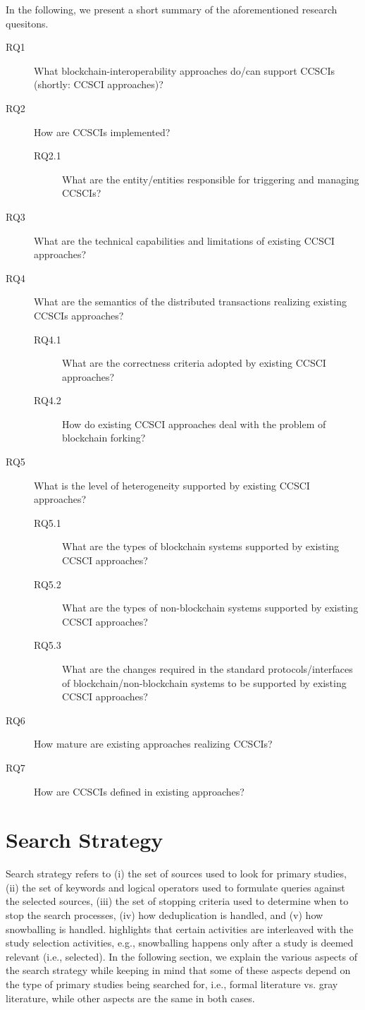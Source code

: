 \documentclass[review]{elsarticle}
\begin{document}
In the following, we present a short summary of the aforementioned research quesitons.
\begin{description}
	\item[RQ1] What blockchain-interoperability approaches do/can support CCSCIs (shortly: CCSCI approaches)?
	\item[RQ2] How are CCSCIs implemented?
	\begin{description}
		\item[RQ2.1] What are the entity/entities responsible for triggering and managing CCSCIs?
	\end{description}
	\item[RQ3] What are the technical capabilities and limitations of existing CCSCI approaches?
	\item[RQ4] What are the semantics of the distributed transactions realizing existing CCSCIs approaches?
	\begin{description}
		\item[RQ4.1] What are the correctness criteria adopted by existing CCSCI approaches?
		\item[RQ4.2] How do existing CCSCI approaches deal with the problem of blockchain forking?
	\end{description}
	\item[RQ5] What is the level of heterogeneity supported by existing CCSCI approaches?
	\begin{description}
		\item[RQ5.1] What are the types of blockchain systems supported by existing CCSCI approaches?
		\item[RQ5.2] What are the types of non-blockchain systems supported by existing CCSCI approaches?
		\item[RQ5.3] What are the changes required in the standard protocols/interfaces of blockchain/non-blockchain systems to be supported by existing CCSCI approaches?
	\end{description}
	\item[RQ6] How mature are existing approaches realizing CCSCIs?
	\item[RQ7] How are CCSCIs defined in existing approaches?
\end{description}

\section{Search Strategy}
\label{sec:search-strategy}
Search strategy refers to (i) the set of sources used to look for primary studies, (ii) the set of keywords and logical operators used to formulate queries against the selected sources, (iii) the set of stopping criteria used to determine when to stop the search processes, (iv) how deduplication is handled, and (v) how snowballing is handled.
 highlights that certain activities are interleaved with the study selection activities, e.g., snowballing happens only after a study is deemed relevant (i.e., selected).
In the following section, we explain the various aspects of the search strategy while keeping in mind that some of these aspects depend on the type of primary studies being searched for, i.e., formal literature vs. gray literature, while other aspects are the same in both cases.
\end{document}
